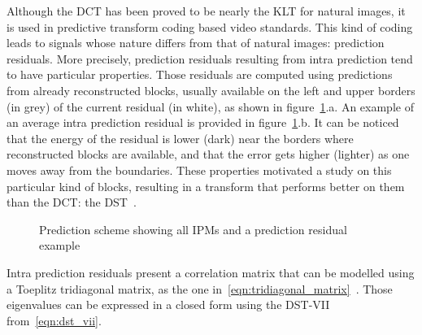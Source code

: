 \documentclass[11pt,a4paper,openright,twoside]{book}
\numberwithin{equation}{section} %
\numberwithin{figure}{section} %
\numberwithin{table}{section} %
\begin{document}
Although the \ac{DCT} has been proved to be nearly the \ac{KLT} for natural
images, it is used in predictive transform coding based video standards.
This kind of coding leads to signals whose nature differs from that of
natural images: prediction residuals.
More precisely, prediction residuals resulting from intra prediction tend to
have particular properties.
Those residuals are computed using predictions from already
reconstructed blocks, usually available on the left and upper borders (in
grey) of the current residual (in white), as shown in
figure~\ref{fig:pred_scheme}.a.
An example of an average intra prediction residual is provided in
figure~\ref{fig:pred_scheme}.b.
It can be noticed that the energy of the residual is lower (dark) near
the borders where reconstructed blocks are available, and that the error
gets higher (lighter) as one moves away from the boundaries.
These properties motivated a study on this particular kind of blocks,
resulting in a transform that performs better on them than the \ac{DCT}:
the \acf{DST}~\cite{han-10-spatial-adaptive-transform}.
\begin{figure}[tb]
	\centering
	\hspace{0.2\linewidth}
	\caption[Example of \aclp{IPM} on a prediction residual]
	{Prediction scheme showing all \aclp{IPM} and a prediction
	residual example}
	\label{fig:pred_scheme}
\end{figure}

Intra prediction residuals present a correlation matrix that can be modelled
using a Toeplitz tridiagonal matrix, as the one
in~\eqref{eqn:tridiagonal_matrix}~\cite{han-10-spatial-adaptive-transform,
yueh-05-eigenvalues-tridiagonal}.
Those eigenvalues can be expressed in a closed form using the \ac{DST}-VII
from~\eqref{eqn:dst_vii}.
\end{document}
